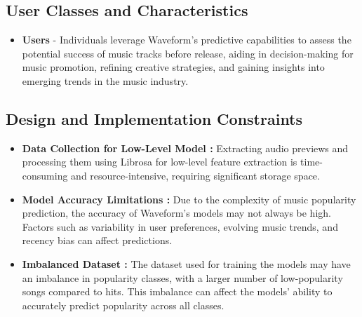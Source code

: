 \documentclass[11pt]{report}
\begin{document}
\subsection{User Classes and Characteristics }
\begin{itemize}
  \item \textbf{Users} - Individuals leverage Waveform's predictive capabilities to assess the potential success of music tracks before release, aiding in decision-making for music promotion, refining creative strategies, and gaining insights into emerging trends in the music industry.
\end{itemize}
\subsection{Design and Implementation Constraints}
\begin{itemize}
    \item \textbf{Data Collection for Low-Level Model :} Extracting audio previews and processing them using Librosa for low-level feature extraction is time-consuming and resource-intensive, requiring significant storage space.
    \item \textbf{Model Accuracy Limitations :} Due to the complexity of music popularity prediction, the accuracy of Waveform's models may not always be high. Factors such as variability in user preferences, evolving music trends, and recency bias can affect predictions.
    \item \textbf{Imbalanced Dataset :} The dataset used for training the models may have an imbalance in popularity classes, with a larger number of low-popularity songs compared to hits. This imbalance can affect the models' ability to accurately predict popularity across all classes.
\end{itemize}
\end{document}
